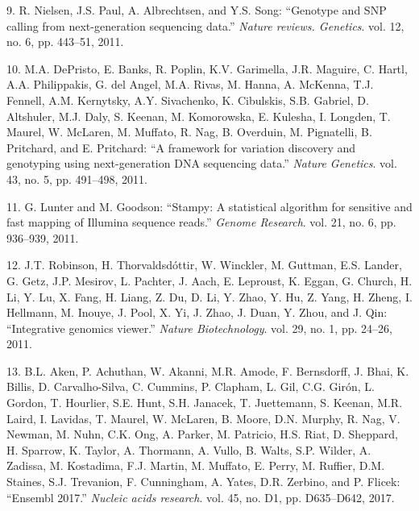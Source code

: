 \documentclass[12pt,twoside]{ugathesis}
\begin{document}
\hypertarget{ref-Nielsen2011}{}
9. R. Nielsen, J.S. Paul, A. Albrechtsen, and Y.S. Song: ``Genotype and
SNP calling from next-generation sequencing data.'' \emph{Nature
reviews. Genetics}. vol. 12, no. 6, pp. 443--51, 2011.

\hypertarget{ref-DePristo2011}{}
10. M.A. DePristo, E. Banks, R. Poplin, K.V. Garimella, J.R. Maguire, C.
Hartl, A.A. Philippakis, G. del Angel, M.A. Rivas, M. Hanna, A. McKenna,
T.J. Fennell, A.M. Kernytsky, A.Y. Sivachenko, K. Cibulskis, S.B.
Gabriel, D. Altshuler, M.J. Daly, S. Keenan, M. Komorowska, E. Kulesha,
I. Longden, T. Maurel, W. McLaren, M. Muffato, R. Nag, B. Overduin, M.
Pignatelli, B. Pritchard, and E. Pritchard: ``A framework for variation
discovery and genotyping using next-generation DNA sequencing data.''
\emph{Nature Genetics}. vol. 43, no. 5, pp. 491--498, 2011.

\hypertarget{ref-Lunter2011}{}
11. G. Lunter and M. Goodson: ``Stampy: A statistical algorithm for
sensitive and fast mapping of Illumina sequence reads.'' \emph{Genome
Research}. vol. 21, no. 6, pp. 936--939, 2011.

\hypertarget{ref-Robinson2011}{}
12. J.T. Robinson, H. Thorvaldsdóttir, W. Winckler, M. Guttman, E.S.
Lander, G. Getz, J.P. Mesirov, L. Pachter, J. Aach, E. Leproust, K.
Eggan, G. Church, H. Li, Y. Lu, X. Fang, H. Liang, Z. Du, D. Li, Y.
Zhao, Y. Hu, Z. Yang, H. Zheng, I. Hellmann, M. Inouye, J. Pool, X. Yi,
J. Zhao, J. Duan, Y. Zhou, and J. Qin: ``Integrative genomics viewer.''
\emph{Nature Biotechnology}. vol. 29, no. 1, pp. 24--26, 2011.

\hypertarget{ref-Aken2017}{}
13. B.L. Aken, P. Achuthan, W. Akanni, M.R. Amode, F. Bernsdorff, J.
Bhai, K. Billis, D. Carvalho-Silva, C. Cummins, P. Clapham, L. Gil, C.G.
Girón, L. Gordon, T. Hourlier, S.E. Hunt, S.H. Janacek, T. Juettemann,
S. Keenan, M.R. Laird, I. Lavidas, T. Maurel, W. McLaren, B. Moore, D.N.
Murphy, R. Nag, V. Newman, M. Nuhn, C.K. Ong, A. Parker, M. Patricio,
H.S. Riat, D. Sheppard, H. Sparrow, K. Taylor, A. Thormann, A. Vullo, B.
Walts, S.P. Wilder, A. Zadissa, M. Kostadima, F.J. Martin, M. Muffato,
E. Perry, M. Ruffier, D.M. Staines, S.J. Trevanion, F. Cunningham, A.
Yates, D.R. Zerbino, and P. Flicek: ``Ensembl 2017.'' \emph{Nucleic
acids research}. vol. 45, no. D1, pp. D635--D642, 2017.
\end{document}
